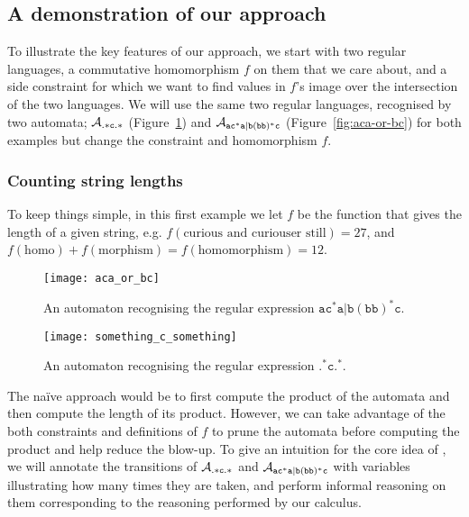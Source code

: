 \documentclass[acmsmall,review,anonymous,screen]{acmart}\settopmatter{printfolios=true,printccs=false,printacmref=true}
\theoremstyle{definition}
\begin{document}
\subsection{A demonstration of our approach}\label{sec:introduction:motivation}

To illustrate the key features of our approach, we start with two regular
languages, a commutative homomorphism $f$ on them that we care about, and a side
constraint for which we want to find values in $f$'s image over the intersection
of the two languages. We will use the same two regular languages, recognised by
two automata; $\mathcal{A}_{\mathtt{.*c.*}}{}$ (Figure~\ref{fig:something-c-something})
and $\mathcal{A}_{\mathtt{ac^*a|b(bb)^*c}}{}$ (Figure~\ref{fig:aca-or-bc}) for both examples but change the
constraint and homomorphism $f$.

\subsubsection{Counting string lengths}

To keep things simple, in this first example we
let $f$ be the function that gives the length of a given string, e.g.
$f\left(\text{curious and curiouser still}\right) = 27$, and $f\left(\text{homo}\right) +
f\left(\text{morphism}\right) = f\left(\text{homomorphism}\right) = 12$.

\begin{figure}[h]
  \begin{minipage}[b]{0.75\linewidth}
  \centering 
    \texttt{[image: aca\_or\_bc]}
    \caption{An automaton recognising the regular expression
    $\mathtt{ac^*a|b(bb)^*c}$.}\label{fig:aca-or-bc}

    \texttt{[image: something\_c\_something]}
    \caption{An automaton recognising the regular expression
    $\mathtt{.^*c.^*}$.}\label{fig:something-c-something}
  \end{minipage}
  \end{figure}

The na\"ive approach would be to first compute the product of the automata and
then compute the length of its product. However, we can take advantage of the
both constraints and definitions of $f$ to prune the automata before computing
the product and help reduce the blow-up. To give an intuition for the core idea
of \Calculus{}, we will annotate the transitions of $\mathcal{A}_{\mathtt{.*c.*}}$ and
$\mathcal{A}_{\mathtt{ac^*a|b(bb)^*c}}$ with variables illustrating how many times they are taken, and
perform informal reasoning on them corresponding to the reasoning performed by
our calculus.
\end{document}
